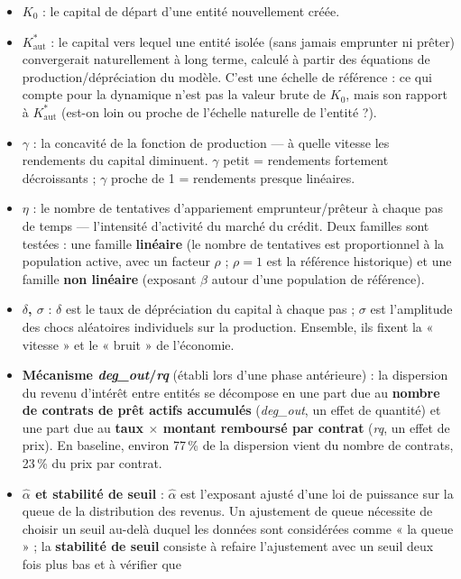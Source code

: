\documentclass[11pt,a4paper]{article}
\newcommand{\Kaut}{K^{*}_{\mathrm{aut}}}
\begin{document}
\begin{itemize}
\item \textbf{$K_0$} : le capital de départ d'une entité nouvellement créée.
\item \textbf{$\Kaut$} : le capital vers lequel une entité isolée (sans
  jamais emprunter ni prêter) convergerait naturellement à long terme,
  calculé à partir des équations de production/dépréciation du modèle.
  C'est une échelle de référence : ce qui compte pour la dynamique
  n'est pas la valeur brute de $K_0$, mais son rapport à $\Kaut$
  (est-on loin ou proche de l'échelle naturelle de l'entité ?).
\item \textbf{$\gamma$} : la concavité de la fonction de production ---
  à quelle vitesse les rendements du capital diminuent. $\gamma$ petit
  = rendements fortement décroissants ; $\gamma$ proche de 1 =
  rendements presque linéaires.
\item \textbf{$\eta$} : le nombre de tentatives d'appariement
  emprunteur/prêteur à chaque pas de temps --- l'intensité d'activité
  du marché du crédit. Deux familles sont testées : une famille
  \textbf{linéaire} (le nombre de tentatives est proportionnel à la
  population active, avec un facteur $\rho$ ; $\rho=1$ est la référence
  historique) et une famille \textbf{non linéaire} (exposant $\beta$
  autour d'une population de référence).
\item \textbf{$\delta$, $\sigma$} : $\delta$ est le taux de
  dépréciation du capital à chaque pas ; $\sigma$ est l'amplitude des
  chocs aléatoires individuels sur la production. Ensemble, ils fixent
  la « vitesse » et le « bruit » de l'économie.
\item \textbf{Mécanisme \emph{deg\_out}/\emph{rq}} (établi lors d'une
  phase antérieure) : la dispersion du revenu d'intérêt entre entités
  se décompose en une part due au \textbf{nombre de contrats de prêt
  actifs accumulés} (\emph{deg\_out}, un effet de quantité) et une part
  due au \textbf{taux $\times$ montant remboursé par contrat}
  (\emph{rq}, un effet de prix). En baseline, environ 77\,\% de la
  dispersion vient du nombre de contrats, 23\,\% du prix par contrat.
\item \textbf{$\hat\alpha$ et stabilité de seuil} : $\hat\alpha$ est
  l'exposant ajusté d'une loi de puissance sur la queue de la
  distribution des revenus. Un ajustement de queue nécessite de choisir
  un seuil au-delà duquel les données sont considérées comme « la
  queue » ; la \textbf{stabilité de seuil} consiste à refaire
  l'ajustement avec un seuil deux fois plus bas et à vérifier que

\end{itemize}
\end{document}
